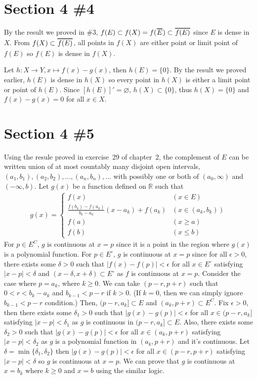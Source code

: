 \documentclass{scrartcl}
\newcommand\Overline[2][0.8pt]{%
  \begin{tikzpicture}[baseline=(a.base)]
    \node[inner xsep=0pt,inner ysep=1.5pt] (a) {$#2$};
    \draw[line width= #1] (a.north west) -- (a.north east);
  \end{tikzpicture}
}
\begin{document}
\section{Section 4 \#4}
By the result we proved in \#3, \(f(E) \subset f(X) = f(\Overline{E}) \subset \Overline{f(E)}\) since \(E\) is dense in \(X\).
From \(f(X) \subset \Overline{f(E)}\), all points in \(f(X)\) are either point or limit point of \(f(E)\) so \(f(E)\) is dense in \(f(X)\).

Let \(h: X \to Y, x \mapsto f(x) - g(x)\), then \(h(E) = \{0\}\).
By the result we proved earlier, \(h(E)\) is dense in \(h(X)\) so every point in \(h(X)\) is either a limit point or point of \(h(E)\).
Since \([h(E)]' = \varnothing\), \(h(X) \subset \{0\}\), thus \(h(X) = \{0\}\) and \(f(x) - g(x) = 0\) for all \(x \in X\).

\section{Section 4 \#5}
Using the resule proved in exercise~29 of chapter~2, the complement of \(E\) can be written union of at most countably many disjoint open intervals, \((a_1, b_1), (a_2, b_2), \dots, (a_n, b_n), \dots\) with possibly one or both of \((a_0, \infty)\) and \((-\infty, b)\).
Let \(g(x)\) be a function defined on \(\mathbb{R}\) such that
\begin{align*}
  g(x) = \begin{cases}
    f(x) & (x \in E) \\
    \frac{f(b_k) - f(a_k)}{b_k - a_k} (x - a_k) + f(a_k) & (x \in (a_k, b_k)) \\
    f(a) & (x \geq a) \\
    f(b) & (x \leq b)
  \end{cases}
\end{align*}
For \(p \in E^C\), \(g\) is continuous at \(x = p\) since it is a point in the region where \(g(x)\) is a polynomial function.
For \(p \in E^\circ\), \(g\) is continuous at \(x = p\) since for all \(\epsilon > 0\), there exists some \(\delta > 0\) such that \(|f(x) - f(p)| < \epsilon\) for all \(x \in E^\circ\) satisfying \(|x - p| < \delta\) and \((x - \delta, x + \delta) \subset E^\circ\) as \(f\) is continuous at \(x = p\).
Consider the case where \(p = a_k\), where \(k \geq 0\).
We can take \((p - r, p + r)\) such that \(0 < r < b_k - a_k\) and \(b_{k - 1} < p - r\) if \(k > 0\).
(If \(k = 0\), then we can simply ignore \(b_{k - 1} < p - r\) condition.)
Then, \((p - r, a_k] \subset E\) and \((a_k, p + r) \subset E^C\).
Fix \(\epsilon > 0\), then there exists some \(\delta_1 > 0\) such that \(|g(x) - g(p)| < \epsilon\) for all \(x \in (p - r, a_k]\) satisfying \(|x - p| < \delta_1\) as \(g\) is continuous in \((p - r, a_k] \subset E\).
Also, there exists some \(\delta_2 > 0\) such that \(|g(x) - g(p)| < \epsilon\) for all \(x \in (a_k, p + r)\) satisfying \(|x - p| < \delta_2\) as \(g\) is a polynomial function in \((a_k, p + r)\) and it's continuous.
Let \(\delta = \min \{\delta_1, \delta_2\}\) then \(|g(x) - g(p)| < \epsilon\) for all \(x \in (p - r, p + r)\) satisfying \(|x - p| < \delta\) so \(g\) is continuous at \(x = p\).
We can prove that \(g\) is continuous at \(x = b_k\) where \(k \geq 0\) and \(x = b\) using the similar logic.
\end{document}
